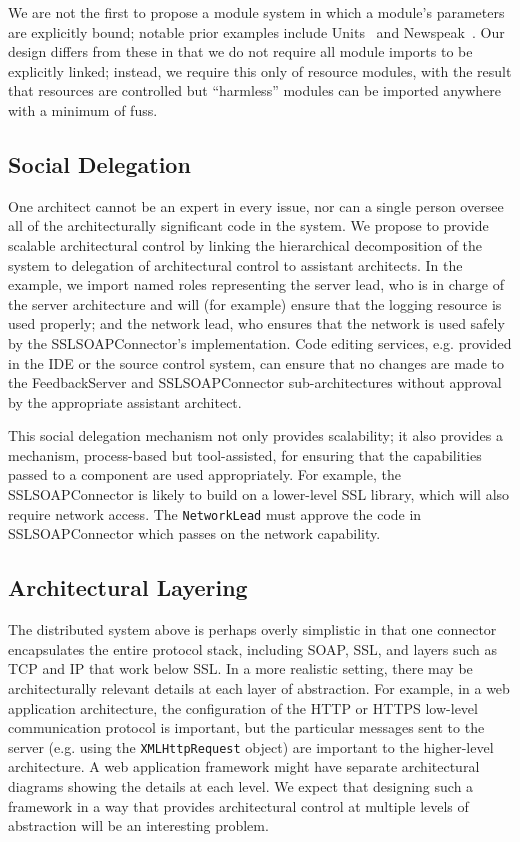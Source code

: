 \documentclass[runningheads]{llncs}
\begin{document}
\begin{sloppypar}
We are not the first to propose a module system in which a module's parameters are explicitly bound; notable prior examples include Units~\cite{FF98} and Newspeak~\cite{BrachaNewspeakModules}.  Our design differs from these in that we do not require all module imports to be explicitly linked; instead, we require this only of resource modules, with the result that resources are controlled but ``harmless'' modules can be imported anywhere with a minimum of fuss.

\subsection{Social Delegation}

One architect cannot be an expert in every issue, nor can a single person oversee all of the architecturally significant code in the system.  We propose to provide scalable architectural control by linking the hierarchical decomposition of the system to delegation of architectural control to assistant architects.  In the example, we import named roles representing the server lead, who is in charge of the server architecture and will (for example) ensure that the logging resource is used properly; and the network lead, who ensures that the network is used safely by the SSLSOAPConnector's implementation.  Code editing services, e.g. provided in the IDE or the source control system, can ensure that no changes are made to the FeedbackServer and SSLSOAPConnector sub-architectures without approval by the appropriate assistant architect.

This social delegation mechanism not only provides scalability; it also provides a mechanism, process-based but tool-assisted, for ensuring that the capabilities passed to a component are used appropriately.  For example, the SSLSOAPConnector is likely to build on a lower-level SSL library, which will also require network access.  The \texttt{NetworkLead} must approve the code in SSLSOAPConnector which passes on the network capability.


\subsection{Architectural Layering}

The distributed system above is perhaps overly simplistic in that one connector encapsulates the entire protocol stack, including SOAP, SSL, and layers such as TCP and IP that work below SSL.  In a more realistic setting, there may be architecturally relevant details at each layer of abstraction.  For example, in a web application architecture, the configuration of the HTTP or HTTPS low-level communication protocol is important, but the particular messages sent to the server (e.g. using the \texttt{XMLHttpRequest} object) are important to the higher-level architecture.  A web application framework might have separate architectural diagrams showing the details at each level.  We expect that designing such a framework in a way that provides architectural control at multiple levels of abstraction will be an interesting problem.




\end{sloppypar}
\end{document}
